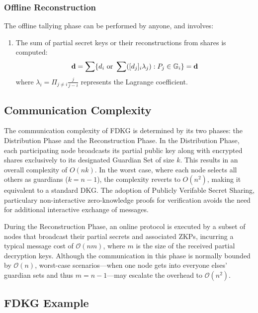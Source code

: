 \documentclass[lettersize,journal]{IEEEtran}
\theoremstyle{definition}
\begin{document}
\subsubsection{Offline Reconstruction}

The offline tallying phase can be performed by anyone, and involves:

\begin{enumerate}
    \item The sum of partial secret keys or their reconstructions from shares is computed:
 \[\textbf{d}{} = \sum\{d_{i} \textrm{ or } \sum ([d_{j}]_{i} \lambda_{j}) : P_{j} \in \mathbb{G}_{i}\} = \textbf{d}{} \]
  where $\lambda_{i}=\Pi_{j \neq i}\frac{j}{j-i}$ represents the Lagrange coefficient.
 
\end{enumerate}

\subsection{Communication Complexity}

The communication complexity of FDKG is determined by its two phases: the Distribution Phase and the Reconstruction Phase. In the Distribution Phase, each participating node broadcasts its partial public key along with encrypted shares exclusively to its designated Guardian Set of size \( k \). This results in an overall complexity of $O(n k)$. In the worst case, where each node selects all others as guardians ($k = n-1$), the complexity reverts to $O(n^2)$, making it equivalent to a standard DKG. The adoption of Publicly Verifable Secret Sharing, particulary non-interactive zero-knowledge proofs for verification avoids the need for additional interactive exchange of messages.

During the Reconstruction Phase, an online protocol is executed by a subset of nodes that broadcast their partial secrets and associated ZKPs, incurring a typical message cost of \(\mathcal{O}(n m)\), where $m$ is the size of the received partial decryption keys. Although the communication in this phase is normally bounded by \(\mathcal{O}(n)\), worst-case scenarios—when one node gets into everyone elses' guardian sets and thus $m=n-1$—may escalate the overhead to \(\mathcal{O}(n^2)\).


\subsection{FDKG Example}
\end{document}
